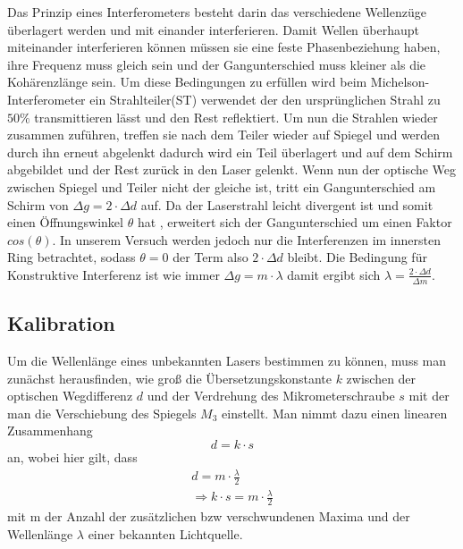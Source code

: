 \documentclass[a4paper, 11pt]{article}
\begin{document}
Das Prinzip eines Interferometers besteht darin das verschiedene Wellenzüge überlagert werden und mit einander interferieren.  Damit Wellen überhaupt miteinander interferieren können müssen sie eine feste Phasenbeziehung haben, ihre Frequenz muss gleich sein und der Gangunterschied muss kleiner als die Kohärenzlänge sein. Um diese Bedingungen zu erfüllen wird beim Michelson-Interferometer ein Strahlteiler(ST) verwendet der den ursprünglichen Strahl zu $50\%$ transmittieren lässt und den Rest reflektiert.  Um nun die Strahlen wieder zusammen zuführen, treffen sie nach dem Teiler wieder auf Spiegel und werden durch ihn erneut abgelenkt dadurch wird ein Teil überlagert und auf dem Schirm abgebildet und der Rest zurück in den Laser gelenkt. Wenn nun der optische Weg zwischen Spiegel und Teiler nicht der gleiche ist, tritt ein Gangunterschied am Schirm von $\Delta g=2 \cdot \Delta d $ auf. Da der Laserstrahl leicht divergent ist und somit einen Öffnungswinkel $\theta$ hat , erweitert sich der Gangunterschied um einen Faktor $cos(\theta)$. In unserem Versuch werden jedoch nur die Interferenzen im innersten Ring betrachtet, sodass $\theta=0$ der Term also $2 \cdot \Delta d$ bleibt. Die Bedingung für Konstruktive Interferenz ist wie immer $\Delta g=m \cdot \lambda $ damit ergibt sich $\lambda = \frac{2 \cdot \Delta d}{\Delta m}$.

\subsection{Kalibration}
Um die Wellenlänge eines unbekannten Lasers bestimmen zu können, muss man zunächst herausfinden, wie groß die Übersetzungskonstante $k$ zwischen der optischen Wegdifferenz $d$ und der Verdrehung des Mikrometerschraube $s$ mit der man die Verschiebung des Spiegels $M_3$ einstellt. Man nimmt dazu einen linearen Zusammenhang \[ d = k \cdot s \] an, wobei hier gilt, dass 
\begin{eqnarray*}
d = m \cdot \frac{\lambda}{2} \\
\Rightarrow k \cdot s = m \cdot \frac{\lambda}{2}
\end{eqnarray*}  mit m der Anzahl der zusätzlichen bzw verschwundenen Maxima und der Wellenlänge $\lambda$ einer bekannten Lichtquelle.
\end{document}
